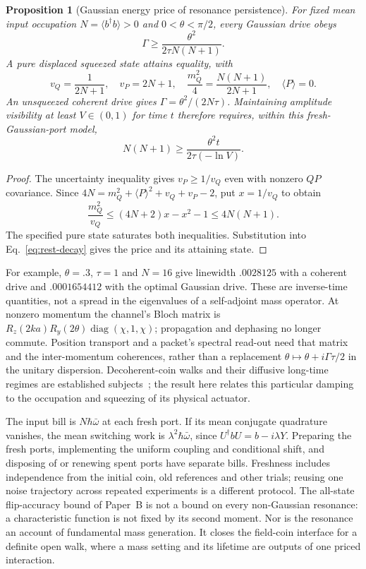 \documentclass[12pt,a4paper]{article}
\newtheorem{proposition}[theorem]{Proposition}
\theoremstyle{definition}
\theoremstyle{remark}
\begin{document}
\begin{proposition}[Gaussian energy price of resonance persistence]
\label{prop:gaussian-linewidth}
For fixed mean input occupation $N=\langle b^\dagger b\rangle>0$ and
$0<\theta<\pi/2$, every Gaussian drive obeys
\begin{equation}\label{eq:linewidth-price}
 \Gamma\ge\frac{\theta^2}{2\tau N(N+1)}.
\end{equation}
A pure displaced squeezed state attains equality, with
\[
 v_Q=\frac1{2N+1},\quad v_P=2N+1,\quad
 \frac{m_Q^2}{4}=\frac{N(N+1)}{2N+1},\quad \langle P\rangle=0.
\]
An unsqueezed coherent drive gives $\Gamma=\theta^2/(2N\tau)$.
Maintaining amplitude visibility at least $V\in(0,1)$ for time $t$ therefore
requires, within this fresh-Gaussian-port model,
\[
 N(N+1)\ge\frac{\theta^2t}{2\tau(-\ln V)}.
\]
\end{proposition}
\begin{proof}
The uncertainty inequality gives $v_P\ge1/v_Q$ even with nonzero
$QP$ covariance. Since
$4N=m_Q^2+\langle P\rangle^2+v_Q+v_P-2$, put $x=1/v_Q$ to obtain
\[
 \frac{m_Q^2}{v_Q}\le(4N+2)x-x^2-1
 \le4N(N+1).
\]
The specified pure state saturates both inequalities. Substitution into
Eq.~\eqref{eq:rest-decay} gives the price and its attaining state.
\end{proof}

For example, $\theta=.3$, $\tau=1$ and $N=16$ give linewidth $.0028125$
with a coherent drive and $.0001654412$ with the optimal Gaussian drive.
These are inverse-time quantities, not a spread in the eigenvalues of a
self-adjoint mass operator. At nonzero momentum the channel's Bloch matrix is
$R_z(2ka)R_y(2\theta)\operatorname{diag}(\chi,1,\chi)$; propagation and
dephasing no longer commute. Position transport and a packet's spectral
read-out need that matrix and the inter-momentum coherences, rather than a
replacement $\theta\mapsto\theta+i\Gamma\tau/2$ in the unitary dispersion.
Decoherent-coin walks and their diffusive long-time regimes are established
subjects~\cite{Brun2002}; the result here relates this particular damping to
the occupation and squeezing of its physical actuator.

The input bill is $N\hbar\bar\omega$ at each fresh port. If its mean
conjugate quadrature vanishes, the mean switching work is
$\lambda^2\hbar\bar\omega$, since
$U^\dagger bU=b-i\lambda Y$. Preparing the fresh ports, implementing the uniform coupling and conditional shift, and disposing of or renewing spent ports have separate bills. Freshness includes independence from the initial coin, old references and other trials; reusing one noise trajectory across repeated experiments is a different protocol. The all-state
flip-accuracy bound of Paper~B is not a bound on every non-Gaussian
resonance: a characteristic function is not fixed by its second moment.
Nor is the resonance an account of fundamental mass generation. It closes
the field-coin interface for a definite open walk, where a mass setting and
its lifetime are outputs of one priced interaction.
\end{document}
